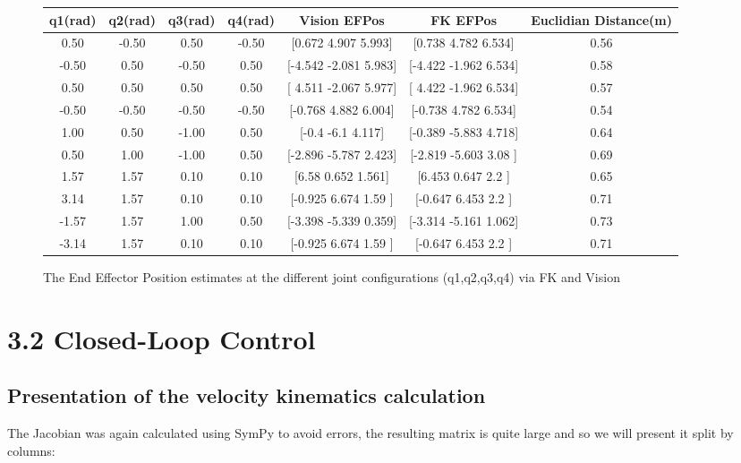 \documentclass{report}
\begin{document}
\begin{figure}[h]

    \begin{center}
        \begin{tabular}{|c|c|c|c|c|c|c|}
        \hline 
         q1(rad)&q2(rad)&q3(rad)&q4(rad)&Vision EFPos &FK EFPos& Euclidian Distance(m) \\ \hline 
        0.50&-0.50&0.50&-0.50&[0.672 4.907 5.993]&[0.738 4.782 6.534]&0.56 \\ \hline 
        -0.50&0.50&-0.50&0.50&[-4.542 -2.081  5.983]&[-4.422 -1.962  6.534]&0.58 \\ \hline 
        0.50&0.50&0.50&0.50&[ 4.511 -2.067  5.977]&[ 4.422 -1.962  6.534]&0.57 \\ \hline 
        -0.50&-0.50&-0.50&-0.50&[-0.768  4.882  6.004]&[-0.738  4.782  6.534]&0.54 \\ \hline 
        1.00&0.50&-1.00&0.50&[-0.4   -6.1    4.117]&[-0.389 -5.883  4.718]&0.64 \\ \hline 
        0.50&1.00&-1.00&0.50&[-2.896 -5.787  2.423]&[-2.819 -5.603  3.08 ]&0.69 \\ \hline 
        1.57&1.57&0.10&0.10&[6.58  0.652 1.561]&[6.453 0.647 2.2  ]&0.65 \\ \hline 
        3.14&1.57&0.10&0.10&[-0.925  6.674  1.59 ]&[-0.647  6.453  2.2  ]&0.71 \\ \hline 
        -1.57&1.57&1.00&0.50&[-3.398 -5.339  0.359]&[-3.314 -5.161  1.062]&0.73 \\ \hline 
        -3.14&1.57&0.10&0.10&[-0.925  6.674  1.59 ]&[-0.647  6.453  2.2  ]&0.71 \\ \hline 
        \end{tabular}
    \end{center}
    \caption{The End Effector Position estimates at the different joint configurations (q1,q2,q3,q4) via FK and Vision}

\end{figure}

\newpage

\section*{3.2 Closed-Loop Control}
\subsection*{Presentation of the velocity kinematics calculation}
The Jacobian was again calculated using SymPy to avoid errors, the resulting matrix is quite large and so we will present it split by columns:
\end{document}
